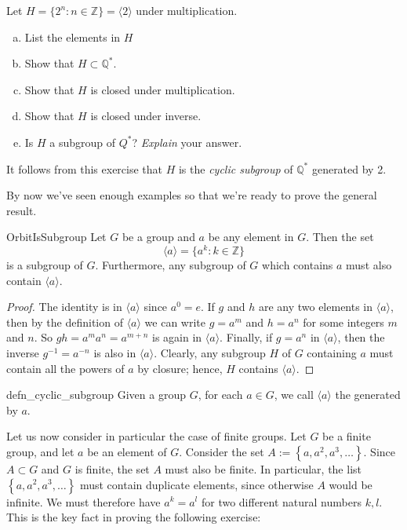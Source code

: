 \begin{exercise}{87}
Let $H = \{ 2^n : n \in {\mathbb Z} \} = \langle 2 \rangle$ under multiplication.
\begin{enumerate}[(a)]
\item
List the elements in $H$
\item
Show that $H \subset {\mathbb Q}^*$.
\item
Show that $H$ is closed under multiplication.
\item
Show that $H$ is closed under inverse.
\item
Is $H$ a subgroup of $Q^*$? \emph{Explain} your answer.
\end{enumerate}
\end{exercise}
It follows from this exercise that   $H$ is the \emph{cyclic subgroup} of ${\mathbb Q}^*$ generated by 2.   

By now we've seen enough examples so that we're ready to prove the general result.

\begin{prop}{OrbitIsSubgroup}
Let $G$ be a group and $a$ be any element in $G$.  Then the set
\[
\langle a \rangle  = \{ a^k : k \in {\mathbb Z} \}\label{generatedby}
\]
is a subgroup of $G$.  Furthermore, any subgroup of $G$ which contains $a$ must also contain $\langle a \rangle$. 
\end{prop}
 
 \begin{proof}
The identity is in $\langle a \rangle $ since $a^0 = e$. If $g$ and
$h$ are any two elements in $\langle a \rangle $, then by the
definition of $\langle a \rangle$ we can write $g = a^m$ and $h = a^n$
for some integers $m$ and $n$. So $gh = a^m a^n = a^{m+n}$ is again in
$\langle a \rangle $. Finally, if $g = a^n$ in $\langle a \rangle $,
then the inverse $g^{-1} = a^{-n}$ is also in $\langle a \rangle $.
Clearly, any subgroup $H$ of $G$ containing $a$ must contain all the
powers of $a$ by closure; hence, $H$ contains $\langle a \rangle $.
\end{proof}
 
\medskip
\begin{defn}{defn_cyclic_subgroup}
Given a group $G$, for each $a \in G$, we call $\langle a \rangle $ the  generated by $a$. 
\end{defn}
 
Let us now consider in particular the case of finite groups. Let $G$ be a finite group, and let $a$ be an element of $G$. Consider the set $A :=\left\{a, a^2, a^3, \ldots \right\}$. Since $A \subset G$ and $G$ is finite, the set $A$ must also be finite. In particular, the list 
$\left\{a, a^2, a^3, \ldots\right\}$ must contain duplicate elements, since otherwise $A$ would be infinite. We must therefore have $a^k = a^l$ for two different natural numbers $k,l$. This is the key fact in proving the following exercise:

